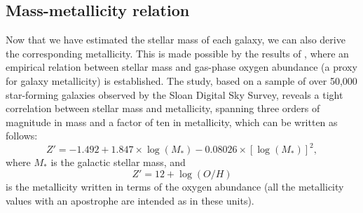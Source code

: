 \subsection{Mass-metallicity relation}
Now that we have estimated the stellar mass of each galaxy, we can also derive the corresponding metallicity.
This is made possible by the results of \cite{Tremonti}, where an empirical relation between stellar mass and gas-phase oxygen abundance (a proxy for galaxy metallicity) is established.
The study, based on a sample of over 50,000 star-forming galaxies observed by the Sloan Digital Sky Survey, reveals a tight correlation between stellar mass and metallicity, spanning three orders of magnitude in mass and a factor of ten in metallicity, which can be written as follows:
\begin{equation}
    Z' = -1.492 + 1.847\times\log(M_*) - 0.08026\times[\log(M_*)]^2,
    \label{eq: mass to metallicity relation}
\end{equation}
where $M_*$ is the galactic stellar mass, and 
\begin{equation}
    Z'= 12+\log(O/H)
    \label{eq: metalliticy weird units definition}
\end{equation}
is the metallicity written in terms of the oxygen abundance (all the metallicity values with an apostrophe are intended as in these units).
